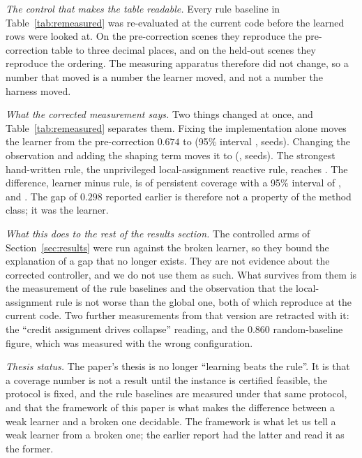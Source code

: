 \documentclass[conference]{IEEEtran}
\begin{document}
\emph{The control that makes the table readable.}  Every rule baseline in
Table~\ref{tab:remeasured} was re-evaluated at the current code before the
learned rows were looked at.  On the pre-correction scenes they reproduce the
pre-correction table to three decimal places, and on the held-out scenes they
reproduce the ordering.  The measuring apparatus therefore did not change, so
a number that moved is a number the learner moved, and not a number the
harness moved.



\emph{What the corrected measurement says.}  Two things changed at once, and Table~\ref{tab:remeasured} separates them.  Fixing the implementation alone moves the learner from the pre-correction $0.674$ to \tokBugFixCK{} (95\% interval \tokBugFixCi, \tokBugFixN{} seeds).  Changing the observation and adding the shaping term moves it to \tokEgoShapeCK{} (\tokEgoShapeCi, \tokEgoShapeN{} seeds).  The strongest hand-written rule, the unprivileged local-assignment reactive rule, reaches \tokRuleReactiveLocalCK.  The difference, learner minus rule, is \tokLearnerMinusRule{} of persistent coverage with a 95\% interval of \tokLearnerMinusRuleCi, and \tokGapVerdict.  The gap of $0.298$ reported earlier is therefore not a property of the method class; it was the learner.

\emph{What this does to the rest of the results section.}  The controlled arms of Section~\ref{sec:results} were run against the broken learner, so they bound the explanation of a gap that no longer exists.  They are not evidence about the corrected controller, and we do not use them as such.  What survives from them is the measurement of the rule baselines and the observation that the local-assignment rule is not worse than the global one, both of which reproduce at the current code.  Two further measurements from that version are retracted with it: the ``credit assignment drives collapse'' reading, and the $0.860$ random-baseline figure, which was measured with the wrong configuration.

\emph{Thesis status.}  The paper's thesis is no longer ``learning beats the
rule''.  It is that a coverage number is not a result until the instance is
certified feasible, the protocol is fixed, and the rule baselines are measured
under that same protocol, and that the framework of this paper is what makes
the difference between a weak learner and a broken one decidable.  The framework is what let us tell a weak learner from a broken one; the earlier report
had the latter and read it as the former.
\end{document}
